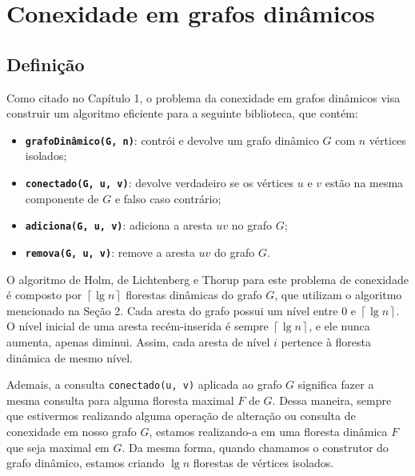 
\chapter{Conexidade em grafos dinâmicos}

\enlargethispage{.8\baselineskip}

\section{Definição}

Como citado no Capítulo 1, o problema da conexidade em grafos dinâmicos visa construir um algoritmo eficiente para a seguinte biblioteca, que contém:

\begin{itemize}
    \item \texttt{\textbf{grafoDinâmico(G, n)}}: contrói e devolve um grafo dinâmico $G$ com $n$ vértices isolados;
    \item \texttt{\textbf{conectado(G, u, v)}}: devolve verdadeiro se os vértices $u$ e $v$ estão na mesma componente de $G$ e falso caso contrário;
    \item \texttt{\textbf{adiciona(G, u, v)}}: adiciona a aresta $uv$ no grafo $G$;
    \item \texttt{\textbf{remova(G, u, v)}}: remove a aresta $uv$ do grafo $G$.
\end{itemize} 

O algoritmo de Holm, de Lichtenberg e Thorup para este problema de conexidade é composto por $\left\lceil \lg n \right\rceil$ florestas dinâmicas do grafo $G$, que utilizam o algoritmo mencionado na Seção 2. Cada aresta do grafo possui um nível entre $0$ e $\left\lceil \lg n \right\rceil$. O nível inicial de uma aresta recém-inserida é sempre $\left\lceil \lg n \right\rceil$, e ele nunca aumenta, apenas diminui. Assim, cada aresta de nível $i$ pertence à floresta dinâmica de mesmo nível. 

Ademais, a consulta \texttt{conectado(u, v)} aplicada ao grafo $G$ significa fazer a mesma consulta para alguma floresta maximal $F$ de $G$. Dessa maneira, sempre que estivermos realizando alguma operação de alteração ou consulta de conexidade em nosso grafo $G$, estamos realizando-a em uma floresta dinâmica $F$ que seja maximal em $G$. Da mesma forma, quando chamamos o construtor do grafo dinâmico, estamos criando $\lg n$ florestas de vértices isolados.


